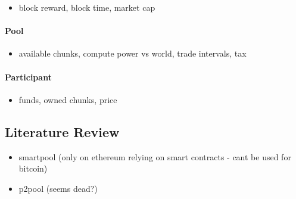 \begin{itemize}
  \item block reward, block time, market cap
\end{itemize}

\paragraph{Pool}

\begin{itemize}
  \item available chunks, compute power vs world, trade intervals, tax
\end{itemize}

\paragraph{Participant}

\begin{itemize}
  \item funds, owned chunks, price
\end{itemize}

\subsection{Literature Review} %

\begin{itemize}
  \item smartpool (only on ethereum relying on smart contracts - cant be used for bitcoin)
  \item p2pool (seems dead?)
\end{itemize}